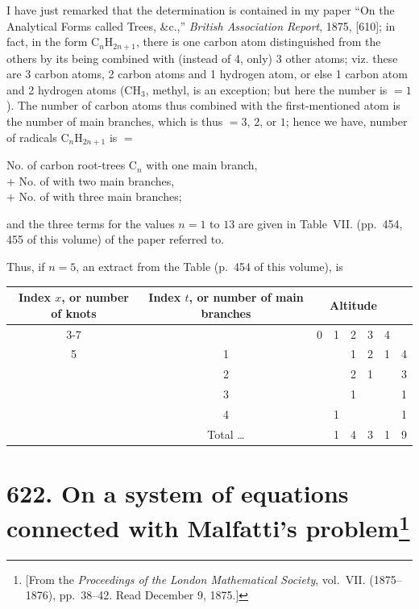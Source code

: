 \documentclass[11pt,a4paper]{book}
\begin{document}
I have just remarked that the determination is contained in my paper ``On the Analytical Forms called Trees, \&c.,'' \textit{British Association Report}, 1875, [610]; in fact, in the form C$_n$H$_{2n+1}$, there is one carbon atom distinguished from the others by its being combined with (instead of 4, only) 3 other atoms; viz. these are 3 carbon atoms, 2 carbon atoms and 1 hydrogen atom, or else 1 carbon atom and 2 hydrogen atoms (CH$_3$, methyl, is an exception; but here the number is $=1$). The number of carbon atoms thus combined with the first-mentioned atom is the number of main branches, which is thus $= 3$, $2$, or $1$; hence we have, number of radicals C$_n$H$_{2n+1}$ is $=$
\begin{center}
No. of carbon root-trees C$_n$ with one main branch,\\
$+$ No. of \quad\quad\quad\quad\quad\quad with two main branches,\\
$+$ No. of \quad\quad\quad\quad\quad\quad with three main branches;
\end{center}
and the three terms for the values $n = 1$ to $13$ are given in Table~VII. (pp.~454, 455 of this volume) of the paper referred to.

Thus, if $n = 5$, an extract from the Table (p.~454 of this volume), is

\begin{center}
\begin{tabular}{|c|c|ccccc|c|}
\hline
\multirow{2}{*}{\parbox{1.5cm}{\centering Index $x$, or number of knots}} & \multirow{2}{*}{\parbox{1.5cm}{\centering Index $t$, or number of main branches}} & \multicolumn{5}{c|}{Altitude} & \\\cline{3-7}
& & 0 & 1 & 2 & 3 & 4 & \\
\hline
5 & 1 & & & 1 & 2 & 1 & 4\\
& 2 & & & 2 & 1 & & 3\\
& 3 & & & 1 & & & 1\\
& 4 & & 1 & & & & 1\\
\hline
& Total \ldots & & 1 & 4 & 3 & 1 & 9\\
\hline
\end{tabular}
\end{center}

\newpage
\section[On a system of equations connected with Malfatti's problem]{\textbf{622.} On a system of equations connected with Malfatti's problem\footnote{[From the \textit{Proceedings of the London Mathematical Society}, vol.~VII. (1875--1876), pp.~38--42. Read December 9, 1875.]}}
\end{document}
